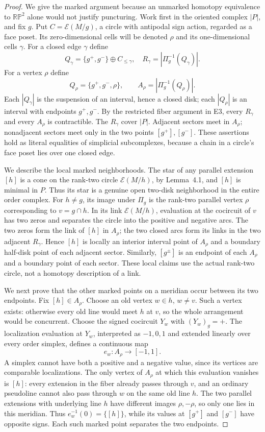 \documentclass[11pt,a4paper]{article}
\begin{document}
\begin{proof}
We give the marked argument because an unmarked homotopy equivalence to
$\mathbb {RP}^2$ alone would not justify puncturing.
Work first in the oriented complex $|P|$, and fix $g$. Put
$C=\mathcal E(M/g)$, a circle with antipodal sign action, regarded as a
face poset. Its zero-dimensional cells will be denoted $\rho$ and its
one-dimensional cells $\gamma$. For a closed edge $\gamma$ define
\[
 Q_\gamma=\{g^+,g^-\}\oplus C_{\leq\gamma},\quad
 R_\gamma=|\Pi_g^{-1}(Q_\gamma)|.
\]
For a vertex $\rho$ define
\[
 Q_\rho=\{g^+,g^-,\rho\},\qquad
 A_\rho=|\Pi_g^{-1}(Q_\rho)|.
\]
Each $|Q_\gamma|$ is the suspension of an interval, hence a closed disk;
each $|Q_\rho|$ is an interval with endpoints $g^+,g^-$. By the restricted
fiber argument in E3, every $R_\gamma$ and every $A_\rho$ is contractible.
The $R_\gamma$ cover $|P|$. Adjacent sectors meet in $A_\rho$; nonadjacent
sectors meet only in the two points $[g^+],[g^-]$. These assertions hold as
literal equalities of simplicial subcomplexes, because a chain in a circle's
face poset lies over one closed edge.

We describe the local marked neighborhoods. The star of any parallel
extension $[h]$ is a cone on the rank-two circle $\mathcal E(M/h)$, by
Lemma~4.1, and $[h]$ is minimal in $P$. Thus its star is a genuine open
two-disk neighborhood in the entire order complex. For $h\neq g$, its image
under $\Pi_g$ is the rank-two parallel vertex $\rho$ corresponding to
$v=g\cap h$. In its link $\mathcal E(M/h)$, evaluation at the cocircuit of
$v$ has two zeros and separates the circle into the positive and negative
arcs. The two zeros form the link of $[h]$ in $A_\rho$; the two closed arcs
form its links in the two adjacent $R_\gamma$. Hence $[h]$ is locally an
interior interval point of $A_\rho$ and a boundary half-disk point of each
adjacent sector. Similarly, $[g^\pm]$ is an endpoint of each $A_\rho$ and a
boundary point of each sector. These local claims use the actual rank-two
circle, not a homotopy description of a link.

We next prove that the other marked points on a meridian occur between its
two endpoints. Fix $[h]\in A_\rho$. Choose an old vertex $w\in h$, $w\neq v$.
Such a vertex exists: otherwise every old line would meet $h$ at $v$, so the
whole arrangement would be concurrent. Choose the signed cocircuit $Y_w$
with $(Y_w)_g=+$. The localization evaluation at $Y_w$, interpreted as
$-1,0,1$ and extended linearly over every order simplex, defines a continuous
map
\[
 e_w:A_\rho\longrightarrow[-1,1].
\]
A simplex cannot have both a positive and a negative value, since its
vertices are comparable localizations. The only vertex of $A_\rho$ at
which this evaluation vanishes is $[h]$: every extension in the fiber
already passes through $v$, and an ordinary pseudoline cannot also pass
through $w$ on the same old line $h$. The two parallel extensions with
underlying line $h$ have different images $\rho,-\rho$, so only one lies
in this meridian. Thus $e_w^{-1}(0)=\{[h]\}$, while its values at $[g^+]$
and $[g^-]$ have opposite signs. Each such marked point separates the two
endpoints.


\end{proof}
\end{document}
